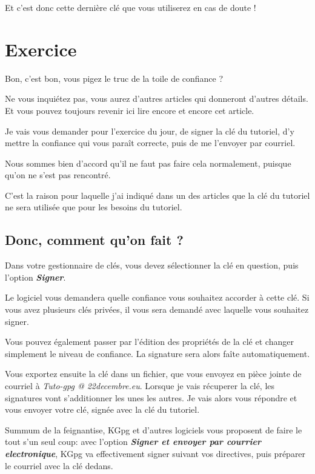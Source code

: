 Et c'est donc cette dernière clé que vous utiliserez en cas de doute !

\section{Exercice}\label{exercice}

Bon, c'est bon, vous pigez le truc de la toile de confiance ?

Ne vous inquiétez pas, vous aurez d'autres articles qui donneront
d'autres détails. Et vous pouvez toujours revenir ici lire encore et
encore cet article.

Je vais vous demander pour l'exercice du jour, de signer la clé du
tutoriel, d'y mettre la confiance qui vous paraît correcte, puis de me
l'envoyer par courriel.

Nous sommes bien d'accord qu'il ne faut pas faire cela normalement,
puisque qu'on ne s'est pas rencontré.

C'est la raison pour laquelle j'ai indiqué dans un des articles que la
clé du tutoriel ne sera utilisée que pour les besoins du tutoriel.

\subsection{Donc, comment qu'on fait ?}\label{donc-comment-quon-fait}

Dans votre gestionnaire de clés, vous devez sélectionner la clé en
question, puis l'option \textbf{\emph{Signer}}.

Le logiciel vous demandera quelle confiance vous souhaitez accorder à
cette clé. Si vous avez plusieurs clés privées, il vous sera demandé
avec laquelle vous souhaitez signer.

Vous pouvez également passer par l'édition des propriétés de la clé et
changer simplement le niveau de confiance. La signature sera alors faîte
automatiquement.

Vous exportez ensuite la clé dans un fichier, que vous envoyez en pièce
jointe de courriel à \emph{Tuto-gpg @ 22decembre.eu}. Lorsque je vais
récuperer la clé, les signatures vont s'additionner les unes les autres.
Je vais alors vous répondre et vous envoyer votre clé, signée avec la
clé du tutoriel.

Summum de la feignantise, KGpg et d'autres logiciels vous proposent de
faire le tout s'un seul coup: avec l'option \textbf{\emph{Signer et
envoyer par courrier electronique}}, KGpg va effectivement signer
suivant vos directives, puis préparer le courriel avec la clé dedans.

